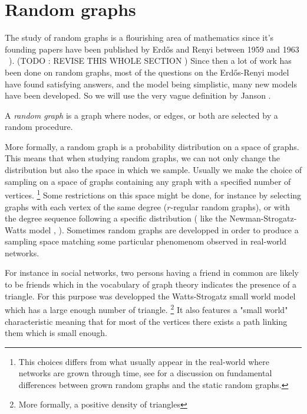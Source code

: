 \section{Random graphs}
The study of random graphs is a flourishing area of mathematics since it's founding papers have been published by Erd\H{o}s and Renyi between 1959 and 1963 \cite{erdos59} \cite{erdos60} \cite{erdosconnect61} \cite{erdosevol61} \cite{erdos63}).
(TODO : REVISE THIS WHOLE SECTION )
Since then a lot of work has been done on random graphs, most of the questions on the Erd\H{o}s-Renyi model have found satisfying answers, and the model being simplistic, many new models have been developed.
So we will use the very vague definition by Janson \cite{Janson14}.
\begin{definition}
	A \emph{random graph} is a graph where nodes, or edges, or both are selected by a random procedure.
\end{definition}
More formally, a random graph is a probability distribution on a space of graphs.
This means that when studying random graphs, we can not only change the distribution but also the space in which we sample.
\newline
Usually we make the choice of sampling on a space of graphs containing any graph with a specified number of vertices.
\footnote{This choices differs from what usually appear in the real-world where networks are grown through time, see \cite{CHKNS01} for a discussion on fundamental differences between grown random graphs and the static random graphs.}
Some restrictions on this space might be done, for instance by selecting graphs with each vertex of the same degree ($r$-regular random graphs), or with the degree sequence following a specific distribution ( like the Newman-Strogatz-Watts model \cite{Newman01}, \cite{Newman02} ).
Sometimes random graphs are developped in order to produce a sampling space matching  some particular phenomenom observed in real-world networks.

For instance in social networks, two persons having a friend in common are likely to be friends which in the vocabulary of graph theory indicates the presence of a triangle.
For this purpose was developped the Watts-Strogatz small world model \cite{WattsStrogatz98} which has a large enough number of triangle. 
\footnote{More formally, a positive density of triangles}
It also features a "small world" characteristic meaning that for most of the vertices there exists a path linking them which is small enough.
\newline

